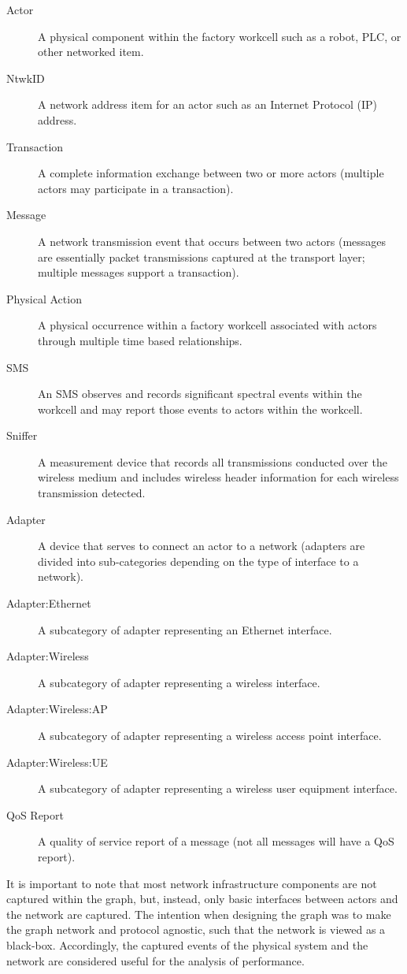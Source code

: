 \begin{description}%
    \item[Actor]  A physical component within the factory workcell such as a robot, PLC, or other networked item.
    \item[NtwkID] A network address item for an actor such as an Internet Protocol (IP) address.
    \item[Transaction] A complete information exchange between two or more actors (multiple actors may participate in a transaction).
    \item[Message] A network transmission event that occurs between two actors (messages are essentially packet transmissions captured at the transport layer; multiple messages support a transaction).
    \item[Physical Action]  A physical occurrence within a factory workcell associated with actors through multiple time based relationships.
    \item[SMS] An SMS observes and records significant spectral events within the workcell and may report those events to actors within the workcell.  
    \item[Sniffer] A measurement device that records all transmissions conducted over the wireless medium and includes wireless header information for each wireless transmission detected.
    \item[Adapter] A device that serves to connect an actor to a network (adapters are divided into sub-categories depending on the type of interface to a network).
    \item[Adapter:Ethernet] A subcategory of adapter representing an Ethernet interface. 
    \item[Adapter:Wireless] A subcategory of adapter representing a wireless interface. 
    \item[Adapter:Wireless:AP]  A subcategory of adapter representing a wireless access point interface.
    \item[Adapter:Wireless:UE] A subcategory of adapter representing a wireless user equipment interface.
    \item[QoS Report] A quality of service report of a message (not all messages will have a QoS report).
\end{description}

It is important to note that most network infrastructure components are not captured within the graph, but, instead, only basic interfaces between actors and the network are captured.  The intention when designing the graph was to make the graph network and protocol agnostic, such that the network is viewed as a black-box. Accordingly, the captured events of the physical system and the network are considered useful for the analysis of performance. 

